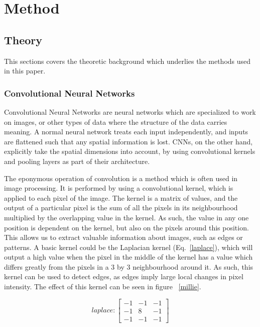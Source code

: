 \documentclass[onecolumn,10pt,cleanfoot]{asme2ej}
\begin{document}
\section{Method}

\subsection{Theory}

This sections covers the theoretic background which underlies the methods used in this paper.

\subsubsection{Convolutional Neural Networks}

Convolutional Neural Networks are neural networks which are specialized to work on images, or other types of data where the structure of the data carries meaning. A normal neural network treats each input independently, and inputs are flattened such that any spatial information is lost. CNNs, on the other hand, explicitly take the spatial dimensions into account, by using convolutional kernels and pooling layers as part of their architecture.

The eponymous operation of convolution is a method which is often used in image processing. It is performed by using a convolutional kernel, which is applied to each pixel of the image. The kernel is a matrix of values, and the output of a particular pixel is the sum of all the pixels in its neighbourhood multiplied by the overlapping value in the kernel. As such, the value in any one position is dependent on the kernel, but also on the pixels around this position. This allows us to extract valuable information about images, such as edges or patterns. A basic kernel could be the Laplacian kernel (Eq.~\ref{laplace}), which will output a high value when the pixel in the middle of the kernel has a value which differs greatly from the pixels in a 3 by 3 neighbourhood around it. As such, this kernel can be used to detect edges, as edges imply large local changes in pixel intensity. The effect of this kernel can be seen in figure ~\ref{millie}.

\begin{equation}
\label{laplace}
laplace : 
\begin{bmatrix}
-1 & -1 & -1 \\
-1 & 8 & -1 \\
-1 & -1 & -1
\end{bmatrix}
\end{equation}
\end{document}
